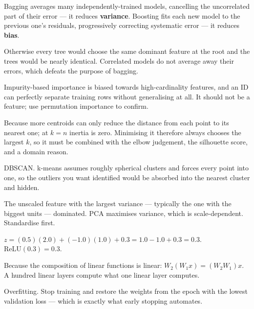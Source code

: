 \begin{ans}
  \item Bagging averages many independently-trained models, cancelling the
        uncorrelated part of their error --- it reduces \textbf{variance}. Boosting
        fits each new model to the previous one's residuals, progressively
        correcting systematic error --- it reduces \textbf{bias}.
  \item Otherwise every tree would choose the same dominant feature at the root and
        the trees would be nearly identical. Correlated models do not average away
        their errors, which defeats the purpose of bagging.
  \item Impurity-based importance is biased towards high-cardinality features, and
        an ID can perfectly separate training rows without generalising at all. It
        should not be a feature; use permutation importance to confirm.
\end{ans}

\begin{ans}
  \item Because more centroids can only reduce the distance from each point to its
        nearest one; at $k=n$ inertia is zero. Minimising it therefore always
        chooses the largest $k$, so it must be combined with the elbow judgement,
        the silhouette score, and a domain reason.
  \item DBSCAN. k-means assumes roughly spherical clusters and forces every point
        into one, so the outliers you want identified would be absorbed into the
        nearest cluster and hidden.
  \item The unscaled feature with the largest variance --- typically the one with
        the biggest units --- dominated. PCA maximises variance, which is
        scale-dependent. Standardise first.
\end{ans}

\begin{ans}
  \item $z = (0.5)(2.0) + (-1.0)(1.0) + 0.3 = 1.0 - 1.0 + 0.3 = 0.3$.
        $\text{ReLU}(0.3) = 0.3$.
  \item Because the composition of linear functions is linear:
        $W_2(W_1x) = (W_2W_1)x$. A hundred linear layers compute what one linear
        layer computes.
  \item Overfitting. Stop training and restore the weights from the epoch with the
        lowest validation loss --- which is exactly what early stopping automates.
\end{ans}

